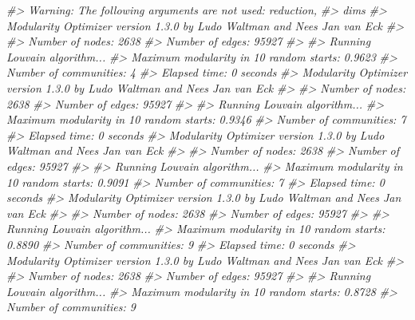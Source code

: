 \documentclass[
]{book}
\newenvironment{Shaded}{\begin{snugshade}}{\end{snugshade}}
\newcommand{\CommentTok}[1]{\textcolor[rgb]{0.56,0.35,0.01}{\textit{#1}}}
\begin{document}
\begin{Shaded}
\begin{Highlighting}[]
\CommentTok{\#\textgreater{} Warning: The following arguments are not used: reduction,}
\CommentTok{\#\textgreater{} dims}
\CommentTok{\#\textgreater{} Modularity Optimizer version 1.3.0 by Ludo Waltman and Nees Jan van Eck}
\CommentTok{\#\textgreater{} }
\CommentTok{\#\textgreater{} Number of nodes: 2638}
\CommentTok{\#\textgreater{} Number of edges: 95927}
\CommentTok{\#\textgreater{} }
\CommentTok{\#\textgreater{} Running Louvain algorithm...}
\CommentTok{\#\textgreater{} Maximum modularity in 10 random starts: 0.9623}
\CommentTok{\#\textgreater{} Number of communities: 4}
\CommentTok{\#\textgreater{} Elapsed time: 0 seconds}
\CommentTok{\#\textgreater{} Modularity Optimizer version 1.3.0 by Ludo Waltman and Nees Jan van Eck}
\CommentTok{\#\textgreater{} }
\CommentTok{\#\textgreater{} Number of nodes: 2638}
\CommentTok{\#\textgreater{} Number of edges: 95927}
\CommentTok{\#\textgreater{} }
\CommentTok{\#\textgreater{} Running Louvain algorithm...}
\CommentTok{\#\textgreater{} Maximum modularity in 10 random starts: 0.9346}
\CommentTok{\#\textgreater{} Number of communities: 7}
\CommentTok{\#\textgreater{} Elapsed time: 0 seconds}
\CommentTok{\#\textgreater{} Modularity Optimizer version 1.3.0 by Ludo Waltman and Nees Jan van Eck}
\CommentTok{\#\textgreater{} }
\CommentTok{\#\textgreater{} Number of nodes: 2638}
\CommentTok{\#\textgreater{} Number of edges: 95927}
\CommentTok{\#\textgreater{} }
\CommentTok{\#\textgreater{} Running Louvain algorithm...}
\CommentTok{\#\textgreater{} Maximum modularity in 10 random starts: 0.9091}
\CommentTok{\#\textgreater{} Number of communities: 7}
\CommentTok{\#\textgreater{} Elapsed time: 0 seconds}
\CommentTok{\#\textgreater{} Modularity Optimizer version 1.3.0 by Ludo Waltman and Nees Jan van Eck}
\CommentTok{\#\textgreater{} }
\CommentTok{\#\textgreater{} Number of nodes: 2638}
\CommentTok{\#\textgreater{} Number of edges: 95927}
\CommentTok{\#\textgreater{} }
\CommentTok{\#\textgreater{} Running Louvain algorithm...}
\CommentTok{\#\textgreater{} Maximum modularity in 10 random starts: 0.8890}
\CommentTok{\#\textgreater{} Number of communities: 9}
\CommentTok{\#\textgreater{} Elapsed time: 0 seconds}
\CommentTok{\#\textgreater{} Modularity Optimizer version 1.3.0 by Ludo Waltman and Nees Jan van Eck}
\CommentTok{\#\textgreater{} }
\CommentTok{\#\textgreater{} Number of nodes: 2638}
\CommentTok{\#\textgreater{} Number of edges: 95927}
\CommentTok{\#\textgreater{} }
\CommentTok{\#\textgreater{} Running Louvain algorithm...}
\CommentTok{\#\textgreater{} Maximum modularity in 10 random starts: 0.8728}
\CommentTok{\#\textgreater{} Number of communities: 9}

\end{Highlighting}
\end{Shaded}
\end{document}

